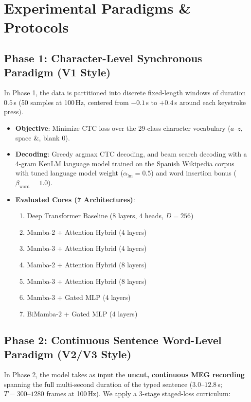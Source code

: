 \documentclass[conference]{IEEEtran}
\begin{document}
\section{Experimental Paradigms \& Protocols}
\label{sec:paradigms}

\subsection{Phase 1: Character-Level Synchronous Paradigm (V1 Style)}
In Phase 1, the data is partitioned into discrete fixed-length windows of duration $0.5$\,s (50 samples at 100\,Hz, centered from $-0.1$\,s to $+0.4$\,s around each keystroke press).
\begin{itemize}
    \item \textbf{Objective}: Minimize CTC loss over the 29-class character vocabulary ($a$--$z$, space $\&$, blank $0$).
    \item \textbf{Decoding}: Greedy argmax CTC decoding, and beam search decoding with a 4-gram KenLM language model trained on the Spanish Wikipedia corpus with tuned language model weight ($\alpha_{\text{lm}} = 0.5$) and word insertion bonus ($\beta_{\text{word}} = 1.0$).
    \item \textbf{Evaluated Cores (7 Architectures)}:
    \begin{enumerate}
        \item Deep Transformer Baseline (8 layers, 4 heads, $D=256$)
        \item Mamba-2 + Attention Hybrid (4 layers)
        \item Mamba-3 + Attention Hybrid (4 layers)
        \item Mamba-2 + Attention Hybrid (8 layers)
        \item Mamba-3 + Attention Hybrid (8 layers)
        \item Mamba-3 + Gated MLP (4 layers)
        \item BiMamba-2 + Gated MLP (4 layers)
    \end{enumerate}
\end{itemize}

\subsection{Phase 2: Continuous Sentence Word-Level Paradigm (V2/V3 Style)}
In Phase 2, the model takes as input the \textbf{uncut, continuous MEG recording} spanning the full multi-second duration of the typed sentence ($3.0\text{--}12.8$\,s; $T = 300\text{--}1280$ frames at 100\,Hz). We apply a 3-stage staged-loss curriculum:
\end{document}
